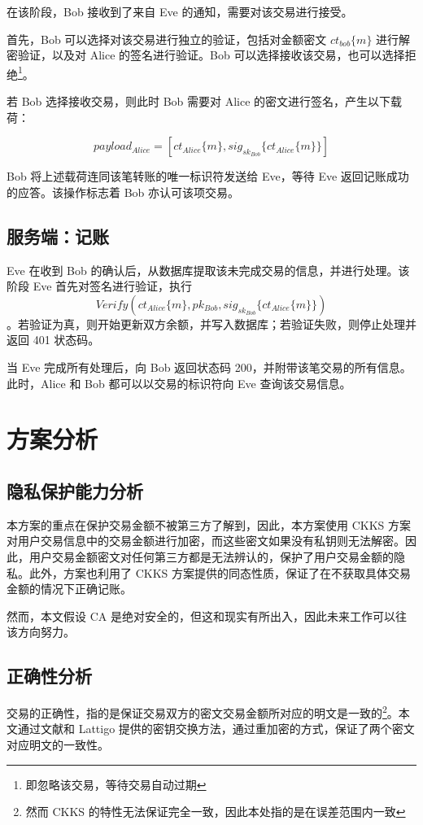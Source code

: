 在该阶段，Bob 接收到了来自 Eve 的通知，需要对该交易进行接受。

首先，Bob 可以选择对该交易进行独立的验证，包括对金额密文 $ct_{bob}\{m\}$ 进行解密验证，以及对 Alice 的签名进行验证。Bob 可以选择接收该交易，也可以选择拒绝\footnote{即忽略该交易，等待交易自动过期}。

若 Bob 选择接收交易，则此时 Bob 需要对 Alice 的密文进行签名，产生以下载荷：

$$payload_{Alice} = [ct_{Alice}\{m\}, sig_{sk_{Bob}}\{ct_{Alice}\{m\}\}]$$

Bob 将上述载荷连同该笔转账的唯一标识符发送给 Eve，等待 Eve 返回记账成功的应答。该操作标志着 Bob 亦认可该项交易。

\subsection{服务端：记账}

Eve 在收到 Bob 的确认后，从数据库提取该未完成交易的信息，并进行处理。该阶段 Eve 首先对签名进行验证，执行 $$Verify(ct_{Alice}\{m\}, pk_{Bob}, sig_{sk_{Bob}}\{ct_{Alice}\{m\}\})$$。若验证为真，则开始更新双方余额，并写入数据库；若验证失败，则停止处理并返回 401 状态码。

当 Eve 完成所有处理后，向 Bob 返回状态码 200，并附带该笔交易的所有信息。
此时，Alice 和 Bob 都可以以交易的标识符向 Eve 查询该交易信息。

\section{方案分析}

\subsection{隐私保护能力分析}

本方案的重点在保护交易金额不被第三方了解到，因此，本方案使用 CKKS 方案对用户交易信息中的交易金额进行加密，而这些密文如果没有私钥则无法解密。因此，用户交易金额密文对任何第三方都是无法辨认的，保护了用户交易金额的隐私。此外，方案也利用了 CKKS 方案提供的同态性质，保证了在不获取具体交易金额的情况下正确记账。

然而，本文假设 CA 是绝对安全的，但这和现实有所出入，因此未来工作可以往该方向努力。

\subsection{正确性分析}

交易的正确性，指的是保证交易双方的密文交易金额所对应的明文是一致的\footnote{然而 CKKS 的特性无法保证完全一致，因此本处指的是在误差范围内一致}。本文通过文献\cite{brakerski2014leveled}和 Lattigo 提供的密钥交换方法，通过重加密的方式，保证了两个密文对应明文的一致性。
